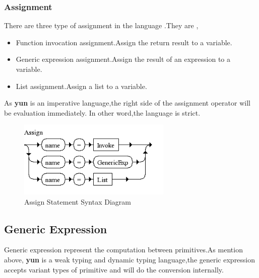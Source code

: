 \subsubsection{Assignment}
There are three type of assignment in the language .They are ,
\begin{itemize}
\item Function invocation assignment.Assign the return result to a variable.
\item Generic expression assignment.Assign the result of an expression to a variable.
\item List assignment.Assign a list to a variable.
\end{itemize}
As \textbf{yun} is an imperative language,the right side of the assignment operator will be evaluation immediately. In other word,the language is strict.



\begin{figure}[h!]
  \centering
	\includegraphics[width=0.65\textwidth]{pic/c4/assign.png}
	\caption{Assign Statement Syntax Diagram}
\end{figure}

\subsection{Generic Expression}
Generic expression represent the computation between primitives.As mention above, \textbf{yun} is  a weak typing and dynamic typing language,the generic expression accepts variant types of primitive and will do the conversion internally.


